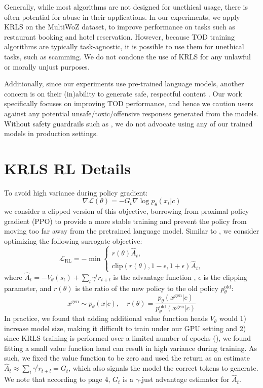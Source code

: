 Generally, while most algorithms are not designed for unethical usage, there is often potential for abuse in
their applications. In our experiments, we apply KRLS on the MultiWoZ \cite{multiwoz} dataset, to improve performance on tasks such as restaurant booking and hotel reservation. However, because TOD training algorithms are typically task-agnostic, it is possible to use them for unethical tasks, such as scamming. We do not condone the use of KRLS for any unlawful or morally unjust purposes.

Additionally, since our experiments use pre-trained language models, another concern is on their (in)ability to generate safe, respectful content \cite{challenges-detoxifying, realtoxicityprompts}. Our work specifically focuses on improving TOD performance, and hence we caution users against any potential unsafe/toxic/offensive responses generated from the models. 
Without safety guardrails such as \citet{director, quark}, we do not advocate using any of our trained models in production settings.

\clearpage
\appendix

\section{KRLS RL Details}
\label{sec:KRLS RL Details}
To avoid high variance during policy gradient:
\[
\nabla \mathcal{L}(\theta) = -G_t \nabla \log p_\theta(x_t|c)
\]
we consider a clipped version of this objective, borrowing from proximal policy gradient (PPO) \cite{PPO} to provide a more stable training and prevent the policy from moving too far away from the pretrained language model. Similar to \citet{TextGAIL}, we consider optimizing the following surrogate objective:
\begin{equation}\label{eq:ppo}
  \mathcal{L}_{\mathrm{RL}}=-\min \begin{cases}
  r(\theta) \hat{A}_t,\\
  \mathrm{clip}(r(\theta), 1-\epsilon, 1+\epsilon) \hat{A}_t,
  \end{cases}
\end{equation}
where $\hat{A}_t = -V_\theta(s_t) + \sum_{l}\gamma^l r_{t+l}$ is the advantage function \cite{gae}, $\epsilon$ is the clipping parameter, and $r(\theta)$ is the ratio of the new policy to the old policy $p_\theta^{\mathrm{old}}$:
\begin{equation}
  x^{\mathrm{gen}} \sim p_\theta(x|c), \quad r(\theta) = \frac{p_\theta(x^{\mathrm{gen}}|c)}{p_\theta^{\mathrm{old}}(x^{\mathrm{gen}}|c)}
\end{equation}
In practice, we found that adding additional value function heads $V_\theta$ would 1) increase model size, making it difficult to train under our GPU setting and 2) since KRLS training is performed over a limited number of epochs (), we found fitting a small value function head can result in high variance during training. As such, we fixed the value function to be zero and used the return as an estimate $\hat{A}_t \approx \sum_{l}\gamma^l r_{t+l} = G_t$, which also signals the model the correct tokens to generate. We note that according to \citet{gae} page 4, $G_t$ is a $\gamma$-just advantage estimator for $\hat{A}_t$.


